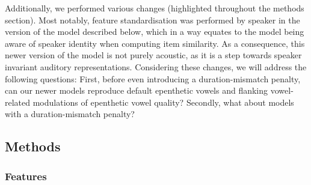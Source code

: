 Additionally, we performed various changes (highlighted throughout the methods section). Most notably, feature standardisation was performed by speaker in the version of the model described below, which in a way equates to the model being aware of speaker identity when computing item similarity. As a consequence, this newer version of the model is not purely acoustic, as it is a step towards speaker invariant auditory representations. Considering these changes, we will address the following questions: First, before even introducing a duration-mismatch penalty, can our newer models reproduce default epenthetic vowels and flanking vowel-related modulations of epenthetic vowel quality? Secondly, what about models with a duration-mismatch penalty?    

\subsection{Methods}
\subsubsection{Features}



